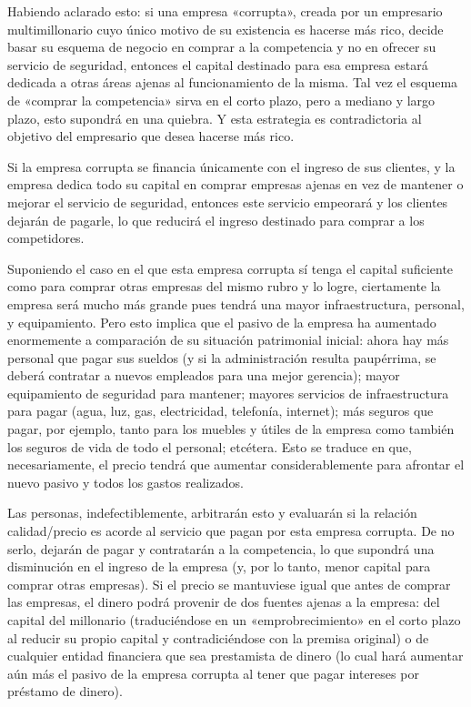 \documentclass[12pt,a4paper,twoside]{book}
\begin{document}
Habiendo aclarado esto: si una empresa «corrupta», creada por un empresario multimillonario cuyo único motivo de su existencia es hacerse más rico, decide basar su esquema de negocio en comprar a la competencia y no en ofrecer su servicio de seguridad, entonces el capital destinado para esa empresa estará dedicada a otras áreas ajenas al funcionamiento de la misma. Tal vez el esquema de «comprar la competencia» sirva en el corto plazo, pero a mediano y largo plazo, esto supondrá en una quiebra. Y esta estrategia es contradictoria al objetivo del empresario que desea hacerse más rico.

Si la empresa corrupta se financia únicamente con el ingreso de sus clientes, y la empresa dedica todo su capital en comprar empresas ajenas en vez de mantener o mejorar el servicio de seguridad, entonces este servicio empeorará y los clientes dejarán de pagarle, lo que reducirá el ingreso destinado para comprar a los competidores.

Suponiendo el caso en el que esta empresa corrupta sí tenga el capital suficiente como para comprar otras empresas del mismo rubro y lo logre, ciertamente la empresa será mucho más grande pues tendrá una mayor infraestructura, personal, y equipamiento. Pero esto implica que el pasivo de la empresa ha aumentado enormemente a comparación de su situación patrimonial inicial: ahora hay más personal que pagar sus sueldos (y si la administración resulta paupérrima, se deberá contratar a nuevos empleados para una mejor gerencia); mayor equipamiento de seguridad para mantener; mayores servicios de infraestructura para pagar (agua, luz, gas, electricidad, telefonía, internet); más seguros que pagar, por ejemplo, tanto para los muebles y útiles de la empresa como también los seguros de vida de todo el personal; etcétera. Esto se traduce en que, necesariamente, el precio tendrá que aumentar considerablemente para afrontar el nuevo pasivo y todos los gastos realizados.

Las personas, indefectiblemente, arbitrarán esto y evaluarán si la relación calidad/precio es acorde al servicio que pagan por esta empresa corrupta. De no serlo, dejarán de pagar y contratarán a la competencia, lo que supondrá una disminución en el ingreso de la empresa (y, por lo tanto, menor capital para comprar otras empresas). Si el precio se mantuviese igual que antes de comprar las empresas, el dinero podrá provenir de dos fuentes ajenas a la empresa: del capital del millonario (traduciéndose en un «emprobrecimiento» en el corto plazo al reducir su propio capital y contradiciéndose con la premisa original) o de cualquier entidad financiera que sea prestamista de dinero (lo cual hará aumentar aún más el pasivo de la empresa corrupta al tener que pagar intereses por préstamo de dinero).
\end{document}
